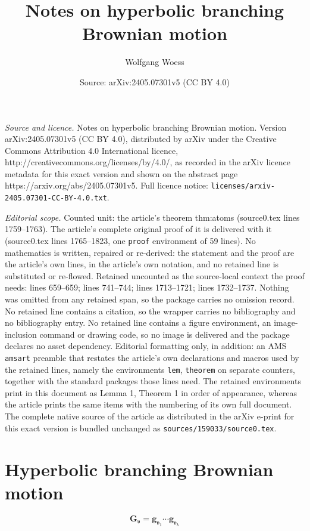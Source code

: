 \documentclass[10pt,a4paper]{amsart}
\title{Notes on hyperbolic branching Brownian motion}
\author{Wolfgang Woess}
\date{Source: arXiv:2405.07301v5 (CC BY 4.0)}
\newcommand\Gb{\mathbf{G}}
\newcommand\gb{\mathbf{g}}
\newcommand\vt{\mathfrak{v}}
\begin{document}
\maketitle

\noindent\emph{Source and licence.} Notes on hyperbolic branching Brownian motion. Version arXiv:2405.07301v5 (CC BY 4.0), distributed by arXiv under the Creative Commons Attribution 4.0 International licence, http://creativecommons.org/licenses/by/4.0/, as recorded in the arXiv licence metadata for this exact version and shown on the abstract page https://arxiv.org/abs/2405.07301v5. Full licence notice: \texttt{licenses/arxiv-2405.07301-CC-BY-4.0.txt}.\par\smallskip

\noindent\textit{Editorial scope.} Counted unit: the article's theorem thm:atoms (source0.tex lines 1759--1763). The article's complete original proof of it is delivered with it (source0.tex lines 1765--1823, one \texttt{proof} environment of 59 lines). No mathematics is written, repaired or re-derived: the statement and the proof are the article's own lines, in the article's own notation, and no retained line is substituted or re-flowed.  Retained uncounted as the source-local context the proof needs: lines 659--659; lines 741--744; lines 1713--1721; lines 1732--1737.  Nothing was omitted from any retained span, so the package carries no omission record.  No retained line contains a citation, so the wrapper carries no bibliography and no bibliography entry.  No retained line contains a figure environment, an image-inclusion command or drawing code, so no image is delivered and the package declares no asset dependency.  Editorial formatting only, in addition: an AMS \texttt{amsart} preamble that restates the article's own declarations and macros used by the retained lines, namely the environments \texttt{lem}, \texttt{theorem} on separate counters, together with the standard packages those lines need.  The retained environments print in this document as Lemma 1, Theorem 1 in order of appearance, whereas the article prints the same items with the numbering of its own full document.  The complete native source of the article as distributed in the arXiv e-print for this exact version is bundled unchanged as \texttt{sources/159033/source0.tex}.
\section{Hyperbolic branching Brownian motion}\label{sec:hypBBM}

\begin{equation}\label{eq:Gv}
\Gb_{\vt} =\gb_{\vt_1}\cdots\gb_{\vt_{k}}
\end{equation}
\end{document}
